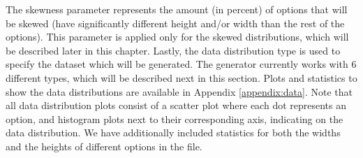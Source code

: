 The skewness parameter represents the amount (in percent) of options that will be skewed (have significantly different height and/or width than the rest of the options). This parameter is applied only for the skewed distributions, which will be described later in this chapter. Lastly, the data distribution type is used to specify the dataset which will be generated. The generator currently works with 6 different types, which will be described next in this section. Plots and statistics to show the data distributions are available in Appendix \ref{appendix:data}. Note that all data distribution plots consist of a scatter plot where each dot represents an option, and histogram plots next to their corresponding axis, indicating on the data distribution. We have additionally included statistics for both the widths and the heights of different options in the file.

